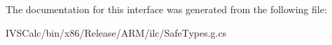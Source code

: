 The documentation for this interface was generated from the following file\+:\begin{DoxyCompactItemize}
\item 
I\+V\+S\+Calc/bin/x86/\+Release/\+A\+R\+M/ilc/Safe\+Types.\+g.\+cs\end{DoxyCompactItemize}
